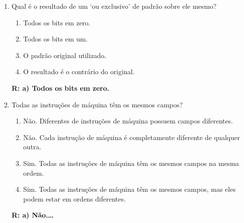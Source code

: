 \documentclass[a4paper,11pt]{article}
\begin{document}
\begin{enumerate}
    \item{Qual é o resultado de um `ou exclusivo' de padrão sobre ele mesmo?}
        \begin{enumerate}
            \item{Todos os bits em zero.}
            \item{Todos os bits em um.}
            \item{O padrão original utilizado.}
            \item{O resultado é o contrário do original.}
        \end{enumerate}
        \textbf{R: a) Todos os bits em zero.}
        \newpage
    \item{Todas as instruções de máquina têm os mesmos campos?}
        \begin{enumerate}
            \item{Não. Diferentes de instruções de máquina possuem campos diferentes.}
            \item{Não. Cada instrução de máquina é completamente diferente de qualquer outra.}
            \item{Sim. Todas as instruções de máquina têm os mesmos campos na mesma ordem.}
            \item{Sim. Todas as instruções de máquina têm os mesmos campos, mas eles podem estar em ordens
                    diferentes.}
        \end{enumerate}
        \textbf{R: a) Não.\dots}
\end{enumerate}

\newpage
\end{document}
